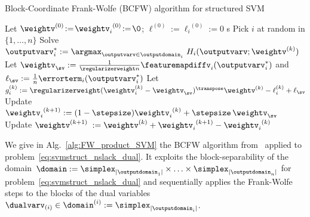 \documentclass{article}
\begin{document}
%
\begin{algorithm}[t]
    \caption{Block-Coordinate Frank-Wolfe (BCFW) algorithm for structured SVM}%
    \label{alg:FW_product_SVM}
\begin{algorithmic}[1]
        \STATE Let $\weightv^{(0)}\!:=\!{\weightv_i}^{(0)}\!:=\!\0$; \; $\ell^{(0)}\!:=\!{\ell_i}^{(0)}\!:=\!0$
       s
                \STATE Pick $i$ at random in $\{1,\ldots,n\}$ \label{alg:FW_product_SVM:randomSample}
                \STATE Solve $\outputvarv_i^* := \displaystyle\argmax_{\outputvarv\in\outputdomain_i} \ H_i(\outputvarv;\weightv^{(k)})$ \label{alg:FW_product_SVM:max_oracle}
                \STATE Let $\weightv_{\sv} := \frac1{\regularizerweight n} \featuremapdiffv_i(\outputvarv_i^*)$ \;
                and \; $\ell_{\sv} := \frac1n \errorterm_i(\outputvarv_i^*)$
               \STATE Let $g_i^{(k)} :=  \regularizerweight (\weightv_i^{(k)}-\weightv_{\sv})^\transpose \weightv^{(k)} - \ell_i^{(k)} + \ell_{\sv}$\label{alg:FW_product_SVM:block_gap}
               \label{alg:FW_product_SVM:line_search}
                \STATE Update ${\weightv_i}^{(k+1)}:= (1-\stepsize){\weightv_i}^{(k)}+\stepsize \,\weightv_{\sv}$
                \STATE Update $\weightv^{(k+1)}\;:= \weightv^{(k)} + {\weightv_i}^{(k+1)} - {\weightv_i}^{(k)}$
        \ENDFOR
\end{algorithmic}
\end{algorithm}


We give in Alg.~\ref{alg:FW_product_SVM} the BCFW algorithm from~\citet{lacosteJulien13bcfw} applied to problem~\eqref{eq:svmstruct_nslack_dual}. It exploits the block-separability of the domain~$\domain := \simplex_{|\outputdomain_1|}\times\mathellipsis\times\simplex_{|\outputdomain_n|}$ for problem~\eqref{eq:svmstruct_nslack_dual} and sequentially applies the Frank-Wolfe steps to the blocks of the dual variables~$\dualvarv_{(i)}\in\domain^{(i)} := \simplex_{|\outputdomain_i|}$.
%
%
%
%
\end{document}
